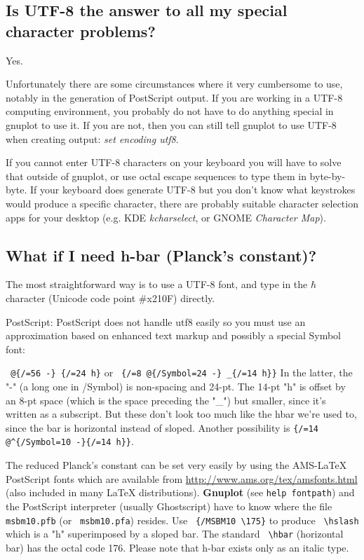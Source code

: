 \documentclass[a4paper,11pt]{article}
\def\http#1{{\small\href{http://#1}{\url{http://#1}}}}
\newcommand{\http}[1]%
            {\htmladdnormallink{\latex{\url{http://#1}}%
                    \html{\textit{http://#1}}}%
                {http://#1}%
            }
\newcommand{\Gnuplot}{\textbf{Gnuplot }}
\begin{document}
\subsection{Is UTF-8 the answer to all my special character problems?}

Yes.

Unfortunately there are some circumstances where it very cumbersome to use,
notably in the generation of PostScript output.
If you are working in a UTF-8 computing environment, you probably do not have to
do anything special in gnuplot to use it.
If you are not, then you can still tell gnuplot to use UTF-8 when creating output:
{\em set encoding utf8}.

If you cannot enter UTF-8 characters on your
keyboard you will have to solve that outside of gnuplot, or use octal escape
sequences to type them in byte-by-byte.  If your keyboard does generate UTF-8
but you don't know what keystrokes would produce a specific character, there
are probably suitable character selection apps for your desktop
(e.g. KDE {\em kcharselect}, or GNOME {\em Character Map}).

\subsection{What if I need h-bar (Planck's constant)?}

The most straightforward way is to use a UTF-8 font, and type in the
$\hbar$ character (Unicode code point \#x210F) directly.

PostScript: PostScript does not handle utf8 easily so you must use an
approximation based on enhanced text markup and possibly a special
Symbol font:

\verb+ @{/=56 -} {/=24 h}+ or
\verb+ {/=8 @{/Symbol=24 -} _{/=14 h}}+
In the latter, the "-" (a long one in /Symbol) is non-spacing and 24-pt.
The 14-pt "h" is offset by an 8-pt space (which is the space preceding
the "\_") but smaller, since it's written as a subscript.
But these don't look too much like the hbar we're used to, since the bar
is horizontal instead of sloped.
Another possibility is \verb+{/=14 @^{/Symbol=10 -}{/=14 h}}+.

The reduced Planck's constant can be set very easily by using the
AMS-LaTeX PostScript fonts which are available from
\http{www.ams.org/tex/amsfonts.html} (also included in many LaTeX
distributions). \Gnuplot{} (see \verb+help fontpath+) and the
PostScript interpreter (usually Ghostscript) have to know where the
file \verb+ msbm10.pfb+ (or \verb+ msbm10.pfa+) resides. Use
\verb+ {/MSBM10 \175}+ to produce \verb+ \hslash+ which is a "h"
superimposed by a sloped bar. The standard \verb+ \hbar+ (horizontal
bar) has the octal code 176. Please note that h-bar exists only as an
italic type.
\end{document}
